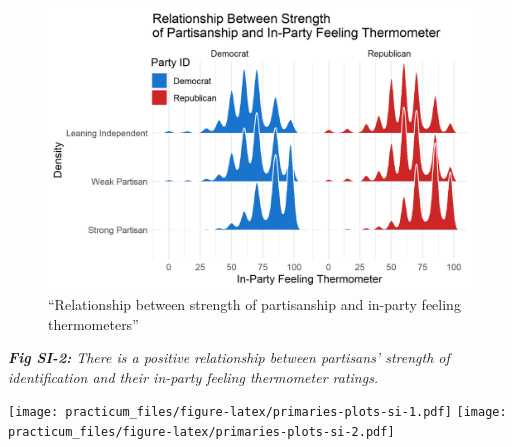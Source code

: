 \documentclass[
]{article}
\begin{document}
\begin{figure}
\centering
\includegraphics{fig/gg-str-therm.png}
\caption{``Relationship between strength of partisanship and in-party feeling thermometers''}
\end{figure}

\emph{\textbf{Fig SI-2:} There is a positive relationship between partisans' strength of identification and their in-party feeling thermometer ratings.}

\texttt{[image: practicum\_files/figure-latex/primaries-plots-si-1.pdf]} \texttt{[image: practicum\_files/figure-latex/primaries-plots-si-2.pdf]}
\end{document}
